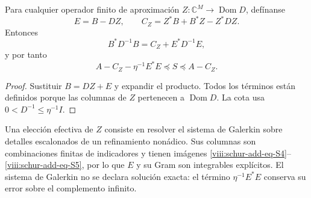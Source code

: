 \begin{theorem}
\label{viii:schur-add-residual}
Para cualquier operador
finito de aproximación \(Z:\mathbb C^M\to\operatorname{Dom}D\), defínanse
\begin{equation}
E=B-DZ,\qquad C_Z=Z^*B+B^*Z-Z^*DZ.
\label{viii:schur-add-display-15}
\end{equation}
Entonces
\begin{equation}
B^*D^{-1}B=C_Z+E^*D^{-1}E,
\label{viii:schur-add-display-16}
\end{equation}
y por tanto
\begin{equation}
\boxed{A-C_Z-\eta^{-1}E^*E\preceq S\preceq A-C_Z.}
\label{viii:schur-add-eq-S7}
\end{equation}
\end{theorem}
\begin{proof}
Sustituir \(B=DZ+E\) y expandir el producto. Todos los
términos están definidos porque las columnas de \(Z\) pertenecen a
\(\operatorname{Dom}D\). La cota usa \(0<D^{-1}\leq\eta^{-1}I\).
\end{proof}

Una elección efectiva de \(Z\) consiste en resolver el sistema de
Galerkin sobre detalles escalonados de un refinamiento nonádico. Sus
columnas son combinaciones finitas de indicadores y tienen imágenes
\eqref{viii:schur-add-eq-S4}--\eqref{viii:schur-add-eq-S5}, por lo que \(E\) y su Gram son integrables explícitos. El
sistema de Galerkin no se declara solución exacta: el término
\(\eta^{-1}E^*E\) conserva su error sobre el complemento infinito.

